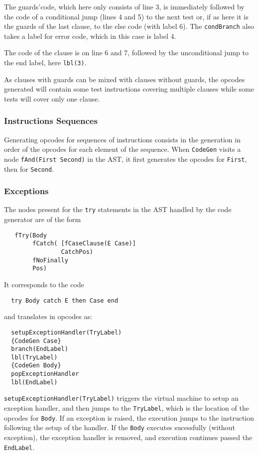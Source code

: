 \documentclass[a4paper]{memoir}
\begin{document}
The guards'code, which here only consists of line 3, is immediately
followed by the code of a conditional jump (lines 4 and 5) to the next test or, if as here it is the guards
of the last clause, to the else code (with label 6). The \lstinline!condBranch!
also takes a label for error code, which in this case is label 4.

The code of the clause is on line 6 and 7, followed by the unconditional jump to
the end label, here \lstinline!lbl(3)!.

As clauses with guards can be mixed with clauses without guards, the opcodes
generated will contain some test instructions covering multiple clauses while
some tests will cover only one clause.

\subsubsection{Instructions Sequences}
Generating opcodes for sequences of instructions consists in the generation in order of the opcodes for each element of the sequence. 
When \lstinline!CodeGen! visits a node \lstinline!fAnd(First Second)! in the AST, it first generates the opcodes for \lstinline!First!, then for \lstinline!Second!.


\subsubsection{Exceptions}\label{sec:arch:codegen:exceptions}
The nodes present for the \lstinline!try! statements in the AST handled by the
code generator are of the form
\begin{lstlisting}
   fTry(Body 
        fCatch( [fCaseClause(E Case)] 
                CatchPos) 
        fNoFinally 
        Pos)
\end{lstlisting}
It corresponds to the code
\begin{lstlisting}
  try Body catch E then Case end
\end{lstlisting}
and translates in opcodes as:
\begin{lstlisting}
  setupExceptionHandler(TryLabel)
  {CodeGen Case}
  branch(EndLabel)
  lbl(TryLabel)
  {CodeGen Body}
  popExceptionHandler
  lbl(EndLabel)
\end{lstlisting}

\lstinline!setupExceptionHandler(TryLabel)! triggers the virtual machine to setup an
exception handler, and then jumps to the \lstinline!TryLabel!, which is the
location of the opcodes for \lstinline!Body!. If an exception is raised, the
execution jumps to the instruction following the setup of the handler. If the
\lstinline!Body! executes sucessfully (without exception), the exception handler
is removed, and execution continues passed the \lstinline!EndLabel!.
\end{document}
